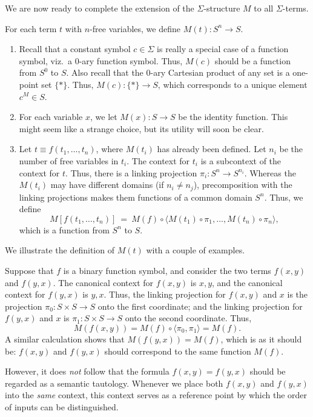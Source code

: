   We are now ready to complete the extension of the $\Sigma$-structure
  $M$ to all $\Sigma$-terms.

  \begin{defn} For each term $t$ with $n$-free variables, we define
    $M(t):S^n\to S$.
  \begin{enumerate}
  \item Recall that a constant symbol $c\in \Sigma$ is really a
    special case of a function symbol, viz.\ a $0$-ary function
    symbol.  Thus, $M(c)$ should be a function from $S^0$ to $S$.
    Also recall that the $0$-ary Cartesian product of any set is a
    one-point set $\{\ast\}$.  Thus, $M(c):\{ \ast \}\to S$, which
    corresponds to a unique element $c^M\in S$.
  \item For each variable $x$, we let $M(x):S\to S$ be the identity
    function.  This might seem like a strange choice, but its utility
    will soon be clear.
  \item Let $t\equiv f(t_1,\dots ,t_n)$, where $M(t_i)$ has already
    been defined.  Let $n_i$ be the number of free variables in $t_i$.
    The context for $t_i$ is a subcontext of the context for $t$.
    Thus, there is a linking projection $\pi _i:S^n\to S^{n_i}$.
    Whereas the $M(t_i)$ may have different domains (if
    $n_i\neq n_j$), precomposition with the linking projections makes
    them functions of a common domain $S^n$.  Thus, we define
    \[ M[f(t_1,\dots ,t_n)] \: = \: M(f)\circ \langle M(t_1)\circ \pi
      _1,\dots ,M(t_n)\circ \pi _n \rangle , \] which is a function
    from $S^n$ to $S$.
  \end{enumerate} \end{defn}

We illustrate the definition of $M(t)$ with a couple of examples.

\begin{example} Suppose that $f$ is a binary function symbol, and
  consider the two terms $f(x,y)$ and $f(y,x)$.  The canonical context
  for $f(x,y)$ is $x,y$, and the canonical context for $f(y,x)$ is
  $y,x$.  Thus, the linking projection for $f(x,y)$ and $x$ is the
  projection $\pi _0:S\times S\to S$ onto the first coordinate; and
  the linking projection for $f(y,x)$ and $x$ is
  $\pi _1:S\times S\to S$ onto the second coordinate.  Thus,
  \[ M(f(x,y)) = M(f)\circ \langle \pi _0,\pi _1 \rangle = M(f) .\] A
  similar calculation shows that $M(f(y,x))=M(f)$, which is as it
  should be: $f(x,y)$ and $f(y,x)$ should correspond to the same
  function $M(f)$.

  However, it does \textit{not} follow that the formula
  $f(x,y)=f(y,x)$ should be regarded as a semantic tautology.
  Whenever we place both $f(x,y)$ and $f(y,x)$ into the \textit{same}
  context, this context serves as a reference point by which the order
  of inputs can be distinguished.
\end{example}

